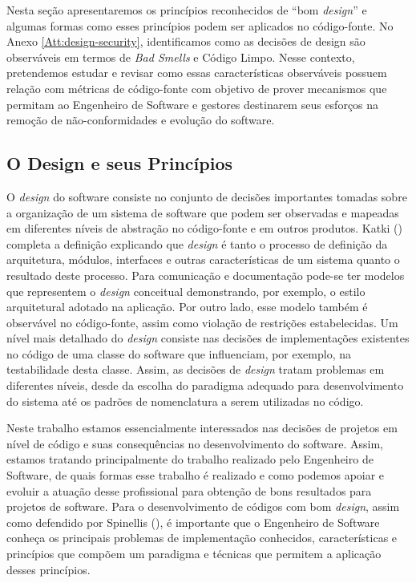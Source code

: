 %

Nesta seção apresentaremos os princípios reconhecidos de ``bom \emph{design}'' e algumas formas como esses princípios podem ser aplicados no código-fonte. No Anexo \ref{Att:design-security}, identificamos como as decisões de design são observáveis em termos de \emph{Bad Smells} e Código Limpo.
%
Nesse contexto, pretendemos estudar e revisar como essas características observáveis possuem relação com métricas de código-fonte com objetivo de prover mecanismos que permitam ao Engenheiro de Software e gestores destinarem seus esforços na remoção de não-conformidades e evolução do software.

\subsection{O Design e seus Princípios}
\label{sec-principles-practises}

O \emph{design} do software consiste no conjunto de decisões importantes tomadas sobre a organização de um sistema de software que podem ser observadas e mapeadas em diferentes níveis de abstração no código-fonte e em outros produtos.
%
Katki (\citeyear{katki1991}) completa a definição explicando que \emph{design} é tanto o processo de definição da arquitetura, módulos, interfaces e outras características de um sistema quanto o resultado deste processo.
%
Para comunicação e documentação pode-se ter modelos que representem o \emph{design} conceitual demonstrando, por exemplo, o estilo arquitetural adotado na aplicação.
%
Por outro lado, esse modelo também é observável no código-fonte, assim como violação de restrições estabelecidas. Um nível mais detalhado do \emph{design} consiste nas decisões de implementações existentes no código de uma classe do software que influenciam, por exemplo, na testabilidade desta classe. Assim, as decisões de \emph{design} tratam problemas em diferentes níveis, desde da escolha do paradigma adequado para desenvolvimento do sistema até os padrões de nomenclatura a serem utilizadas no código.


Neste trabalho estamos essencialmente interessados nas decisões de projetos em nível de código e suas consequências no desenvolvimento do software.
%
Assim, estamos tratando principalmente do trabalho realizado pelo Engenheiro de Software, de quais formas esse trabalho é realizado e como podemos apoiar e evoluir a atuação desse profissional para obtenção de bons resultados para projetos de software.
%
Para o desenvolvimento de códigos com bom \emph{design}, assim como defendido por Spinellis (\citeyear{spinellis2006}), é importante que o Engenheiro de Software conheça os principais problemas de implementação conhecidos, características e princípios que compõem um paradigma e técnicas que permitem a aplicação desses princípios.

